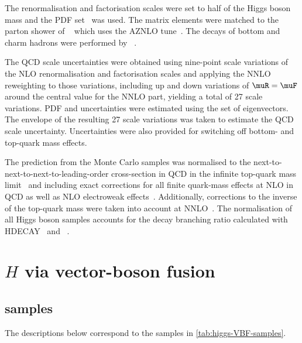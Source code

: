 The renormalisation and factorisation scales were set to half of the Higgs boson mass and the \PDFforLHC[15nnlo] PDF
set~\cite{Butterworth:2015oua} was used. The matrix elements were matched to the parton shower of \PYTHIA[8]~\cite{Sjostrand:2014zea}
which uses the AZNLO tune~\cite{STDM-2012-23}. The decays of bottom and charm hadrons
were performed by \EVTGEN~\cite{Lange:2001uf}.

The QCD scale uncertainties were obtained using nine-point scale variations of the NLO renormalisation and factorisation scales and applying the NNLO reweighting to those variations, including up and down variations of $\muR=\muF$ around the central value for the NNLO part, yielding a total of 27 scale variations.
PDF and \alphas uncertainties were estimated using the \PDFforLHC[15nlo] set of eigenvectors.
The envelope of the resulting 27 scale variations was taken to estimate the QCD scale uncertainty. 
Uncertainties were also provided for switching off bottom- and top-quark mass effects.

The prediction from the Monte Carlo samples was normalised to the next-to-next-to-next-to-leading-order 
cross-section in QCD in the infinite top-quark mass 
limit~\cite{deFlorian:2016spz,Anastasiou:2016cez,Anastasiou:2015ema,Dulat:2018rbf,Aglietti:2004nj} and including exact 
corrections for all finite quark-mass effects at NLO in QCD as well as NLO electroweak 
effects~\cite{Actis:2008ug,Bonetti:2018ukf}. Additionally, corrections to the inverse of the top-quark mass were taken 
into account at NNLO~\cite{Harlander:2009mq,Harlander:2009bw,Harlander:2009my,Pak:2009dg}. 
The normalisation of all Higgs boson samples accounts for the decay branching ratio calculated with 
HDECAY~\cite{Djouadi:1997yw,Spira:1997dg,Djouadi:2006bz}
and \PROPHECY~\cite{Bredenstein:2006ha,Bredenstein:2006rh,Bredenstein:2006nk}.


\section{$H$ via vector-boson fusion}

\subsection*{\texorpdfstring{\POWPY[8]}{Powheg+Pythia8} samples}

The descriptions below correspond to the samples in \cref{tab:higgs-VBF-samples}.

